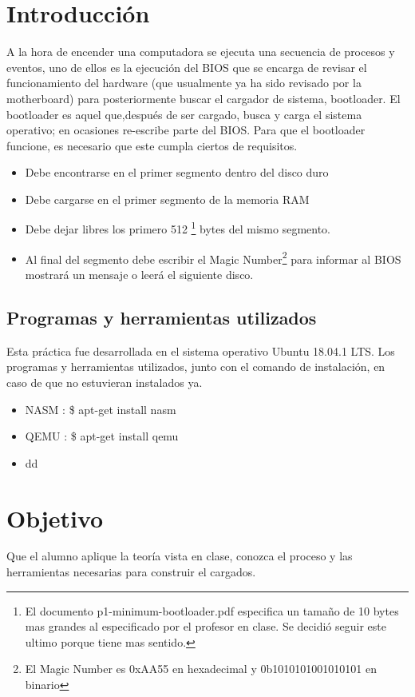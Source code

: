 \documentclass[12pt]{article}
\begin{document}
\section{Introducción}
A la hora de encender una computadora se ejecuta una secuencia de procesos y eventos, uno de ellos es la ejecución del BIOS que se encarga de revisar el funcionamiento del hardware (que usualmente ya ha sido revisado por la motherboard) para posteriormente buscar el cargador de sistema, bootloader. El bootloader es aquel que,después de ser cargado, busca y carga el sistema operativo; en ocasiones re-escribe parte del BIOS. Para que el bootloader funcione, es necesario que este cumpla ciertos de requisitos.
\begin{itemize}
    \item Debe encontrarse en el primer segmento dentro del disco duro
    \item Debe cargarse en el primer segmento de la memoria RAM 
    \item Debe dejar libres los primero 512 \footnote{El documento p1-minimum-bootloader.pdf especifica un tamaño de 10 bytes mas grandes al especificado por el profesor en clase. Se decidió seguir este ultimo porque tiene mas sentido.} bytes del mismo segmento.
    \item Al final del segmento debe escribir el Magic Number\footnote{El Magic Number es 0xAA55 en hexadecimal y  0b1010101001010101 en binario} para informar al BIOS mostrará un mensaje o leerá el siguiente disco.\cite{MagicNumber}
\end{itemize}
\subsection{Programas y herramientas utilizados}
Esta práctica fue desarrollada en el sistema operativo Ubuntu 18.04.1 LTS. Los programas y herramientas utilizados, junto con el comando de instalación, en caso de que no estuvieran instalados ya. 
\begin{itemize}
    \item NASM : \$ apt-get install nasm
    \item QEMU : \$ apt-get install qemu
    \item dd
\end{itemize}
\section{Objetivo}
Que el alumno aplique la teoría vista en clase, conozca el proceso y las herramientas necesarias para construir el cargados.
\end{document}
